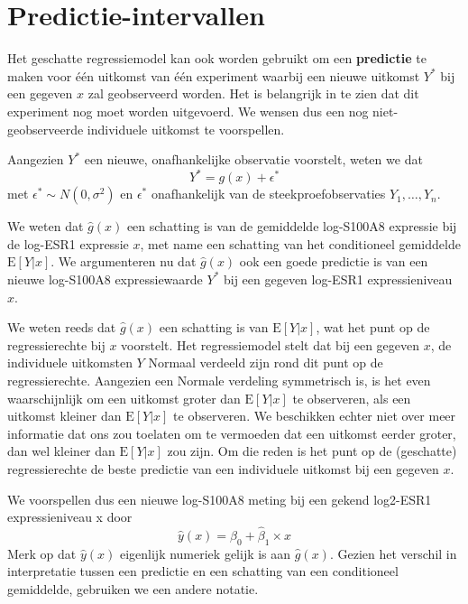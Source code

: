 \documentclass[12pt,dutch,coursenotes]{book}
\theoremstyle{definition}
\theoremstyle{definition}
\theoremstyle{definition}
\theoremstyle{remark}
\begin{document}
\section{Predictie-intervallen}\label{predictie-intervallen}

Het geschatte regressiemodel kan ook worden gebruikt om een
\textbf{predictie} te maken voor één uitkomst van één experiment waarbij
een nieuwe uitkomst \(Y^*\) bij een gegeven \(x\) zal geobserveerd
worden. Het is belangrijk in te zien dat dit experiment nog moet worden
uitgevoerd. We wensen dus een nog niet-geobserveerde individuele
uitkomst te voorspellen.

Aangezien \(Y^*\) een nieuwe, onafhankelijke observatie voorstelt, weten
we dat \[
  Y^* = g(x) + \epsilon^*
\] met \(\epsilon^*\sim N(0,\sigma^2)\) en \(\epsilon^*\) onafhankelijk
van de steekproefobservaties \(Y_1,\ldots, Y_n\).

We weten dat \(\hat{g}(x)\) een schatting is van de gemiddelde
log-S100A8 expressie bij de log-ESR1 expressie \(x\), met name een
schatting van het conditioneel gemiddelde \(\text{E}[Y\vert x]\). We
argumenteren nu dat \(\hat{g}(x)\) ook een goede predictie is van een
nieuwe log-S100A8 expressiewaarde \(Y^*\) bij een gegeven log-ESR1
expressieniveau \(x\).

We weten reeds dat \(\hat{g}(x)\) een schatting is van
\(\text{E}[Y\vert x]\), wat het punt op de regressierechte bij \(x\)
voorstelt. Het regressiemodel stelt dat bij een gegeven \(x\), de
individuele uitkomsten \(Y\) Normaal verdeeld zijn rond dit punt op de
regressierechte. Aangezien een Normale verdeling symmetrisch is, is het
even waarschijnlijk om een uitkomst groter dan \(\text{E}[Y\vert x]\) te
observeren, als een uitkomst kleiner dan \(\text{E}[Y\vert x]\) te
observeren. We beschikken echter niet over meer informatie dat ons zou
toelaten om te vermoeden dat een uitkomst eerder groter, dan wel kleiner
dan \(\text{E}[Y\vert x]\) zou zijn. Om die reden is het punt op de
(geschatte) regressierechte de beste predictie van een individuele
uitkomst bij een gegeven \(x\).

We voorspellen dus een nieuwe log-S100A8 meting bij een gekend log2-ESR1
expressieniveau x door \[
  \hat{y}(x)=\hat{\beta}_0+\hat{\beta}_1 \times x 
\] Merk op dat \(\hat{y}(x)\) eigenlijk numeriek gelijk is aan
\(\hat{g}(x)\). Gezien het verschil in interpretatie tussen een
predictie en een schatting van een conditioneel gemiddelde, gebruiken we
een andere notatie.
\end{document}
